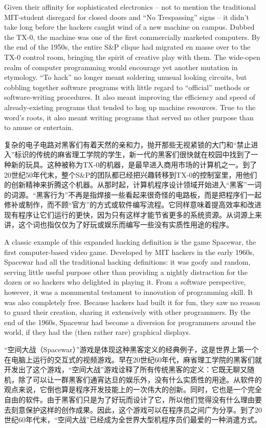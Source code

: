\ifdefined\eng
Given their affinity for sophisticated electronics -- not to mention the traditional MIT-student disregard for closed doors and ``No Trespassing'' signs -- it didn't take long before the hackers caught wind of a new machine on campus. Dubbed the TX-0, the machine was one of the first commercially marketed computers. By the end of the 1950s, the entire S\&P clique had migrated en masse over to the TX-0 control room, bringing the spirit of creative play with them. The wide-open realm of computer programming would encourage yet another mutation in etymology. ``To hack'' no longer meant soldering unusual looking circuits, but cobbling together software programs with little regard to ``official'' methods or software-writing procedures. It also meant improving the efficiency and speed of already-existing programs that tended to hog up machine resources. True to the word's roots, it also meant writing programs that served no other purpose than to amuse or entertain.
\fi

\ifdefined\chs
复杂的电子电路对黑客们有着天然的亲和力，抛开那些无视紧锁的大门和“禁止进入”标识的传统的麻省理工学院的学生，新一代的黑客们很快就在校园中找到了一种新的玩具。这种被称为TX-0的机器，是最早进入商用市场的计算机之一。到了20世纪50年代末，整个S\&P的团队都已经把兴趣转移到TX-0的控制室里，用他们的创新精神来折腾这个机器。从那时起，计算机程序设计领域开始进入“黑客”一词的词源。“黑客行为”不再是指焊接一些看起来很奇怪的电路板，而是把程序们一起修补或制作，而不顾“官方”的方式或软件编写流程。它同样意味着提高效率和改进现有程序让它们运行的更快，因为只有这样才能节省更多的系统资源。从词源上来讲，这个词也指仅仅为了好玩或娱乐而编写一些没有实质性用途的程序。
\fi

\ifdefined\eng
A classic example of this expanded hacking definition is the game Spacewar, the first computer-based video game. Developed by MIT hackers in the early 1960s, Spacewar had all the traditional hacking definitions: it was goofy and random, serving little useful purpose other than providing a nightly distraction for the dozen or so hackers who delighted in playing it. From a software perspective, however, it was a monumental testament to innovation of programming skill. It was also completely free. Because hackers had built it for fun, they saw no reason to guard their creation, sharing it extensively with other programmers. By the end of the 1960s, Spacewar had become a diversion for programmers around the world, if they had the (then rather rare) graphical displays.
\fi

\ifdefined\chs
“空间大战（Spacewar）”游戏是体现这种黑客定义的经典例子，这是世界上第一个在电脑上运行的交互式的视频游戏。早在20世纪60年代，麻省理工学院的黑客们就开发出了这个游戏，“空间大战”游戏诠释了所有传统黑客的定义：它既无聊又随机，除了可以让一群黑客们通宵达旦的娱乐外，没有什么实质性的用途。从软件的观点来说，它倒也算是程序开发技能上的一次伟大的创新。同时，它也是一个完全自由的软件。由于黑客们只是为了好玩而设计了它，所以他们觉得没有什么理由要去刻意保护这样的创作成果。因此，这个游戏可以在程序员之间广为分享。到了20世纪60年代末，“空间大战”已经成为全世界大型机程序员们最爱的一种消遣方式。
\fi

